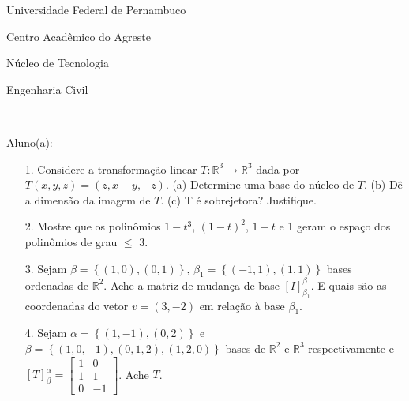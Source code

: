 \documentclass[oneside,a4paper,12pt]{article}
\newcommand{\universidade}{Universidade Federal de Pernambuco}
\newcommand{\centro}{Centro Acadêmico do Agreste}
\newcommand{\departamento}{Núcleo de Tecnologia}
\newcommand{\curso}{Engenharia Civil}
\begin{document}
	\pagestyle{empty}
	
	\begin{center}
	 	\vspace{0pt}
	 	
		\universidade
		\par
		\centro
		\par
		\departamento
		\par
		\curso
		\par
		\vspace{08pt}
		\\
	\end{center}
	
	
	\begin{flushleft}
		Aluno(a):
	\end{flushleft}
	
\begin{itemize}
\item[1.]Considere a transformação linear $T:\mathbb{R}^{3}\longrightarrow \mathbb{R}^{3}$ dada por $T(x,y,z)=(z,x-y,-z)$. (a) Determine uma base do núcleo de $T$. (b) Dê a dimensão da imagem de $T$. (c) T é sobrejetora? Justifique.
\end{itemize}
\begin{itemize}
\item[2.] Mostre que os polinômios $1-t^{3}$, $(1-t)^{2}$, $1-t$ e 1 geram o espaço dos polinômios de grau $\leqslant$ 3. 
 \end{itemize}
 \begin{itemize}
\item [3.]  Sejam $\beta=\left\lbrace (1,0),(0,1) \right\rbrace $, $\beta_{1}=\left\lbrace (-1,1), (1,1)\right\rbrace $ bases ordenadas de $\mathbb{R}^{2}$. Ache a matriz de mudança de base $[I]_{\beta_{1}}^{\beta}$. E quais são as coordenadas do vetor $v=(3,-2)$ em relação à base $\beta_{1}$.
\end{itemize}
\begin{itemize}
\item[4.] Sejam $\alpha=\left\lbrace (1,-1),(0,2)\right\rbrace $ e $\beta=\left\lbrace (1,0,-1),(0,1,2),(1,2,0)\right\rbrace $ bases de $\mathbb{R}^{2}$ e $\mathbb{R}^{3}$ respectivamente e
$[T]_{\beta}^{\alpha}=\left[\begin{array}{rr}
1&0\\
1&1\\
0&-1
\end{array}\right]$. Ache $T$.

\end{itemize}
\end{document}
